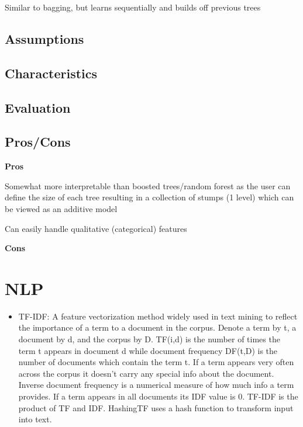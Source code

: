 \documentclass[]{book}
\providecommand{\tightlist}{%
  \setlength{\itemsep}{0pt}\setlength{\parskip}{0pt}}
\theoremstyle{definition}
\theoremstyle{definition}
\theoremstyle{definition}
\theoremstyle{remark}
\begin{document}
Similar to bagging, but learns sequentially and builds off previous
trees

\subsection{Assumptions}\label{assumptions-13}

\subsection{Characteristics}\label{characteristics-8}

\subsection{Evaluation}\label{evaluation-12}

\subsection{Pros/Cons}\label{proscons-13}

\textbf{Pros}

Somewhat more interpretable than boosted trees/random forest as the user
can define the size of each tree resulting in a collection of stumps (1
level) which can be viewed as an additive model

Can easily handle qualitative (categorical) features

\textbf{Cons}

\section{NLP}\label{nlp}

\begin{itemize}
\tightlist
\item
  TF-IDF: A feature vectorization method widely used in text mining to
  reflect the importance of a term to a document in the corpus. Denote a
  term by t, a document by d, and the corpus by D. TF(i,d) is the number
  of times the term t appears in document d while document frequency
  DF(t,D) is the number of documents which contain the term t. If a term
  appears very often across the corpus it doesn't carry any special info
  about the document. Inverse document frequency is a numerical measure
  of how much info a term provides. If a term appears in all documents
  its IDF value is 0. TF-IDF is the product of TF and IDF. HashingTF
  uses a hash function to transform input into text.
\end{itemize}
\end{document}
